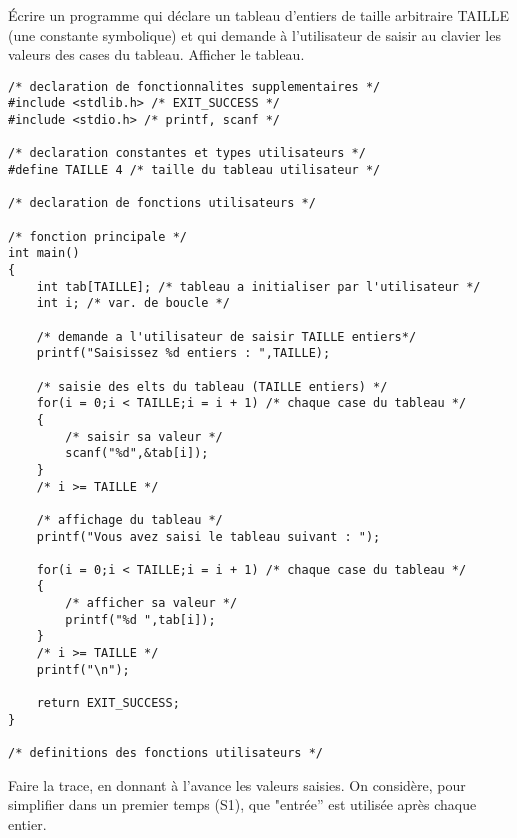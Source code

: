 Écrire un programme qui déclare un tableau d'entiers de taille arbitraire TAILLE (une constante symbolique) et qui demande à l'utilisateur de saisir au clavier les valeurs des cases du tableau. Afficher le tableau.

\begin{correction}
\begin{verbatim}
/* declaration de fonctionnalites supplementaires */
#include <stdlib.h> /* EXIT_SUCCESS */
#include <stdio.h> /* printf, scanf */

/* declaration constantes et types utilisateurs */
#define TAILLE 4 /* taille du tableau utilisateur */

/* declaration de fonctions utilisateurs */

/* fonction principale */
int main()
{
    int tab[TAILLE]; /* tableau a initialiser par l'utilisateur */
    int i; /* var. de boucle */

    /* demande a l'utilisateur de saisir TAILLE entiers*/
    printf("Saisissez %d entiers : ",TAILLE);

    /* saisie des elts du tableau (TAILLE entiers) */
    for(i = 0;i < TAILLE;i = i + 1) /* chaque case du tableau */
    {
        /* saisir sa valeur */
        scanf("%d",&tab[i]);
    }
    /* i >= TAILLE */

    /* affichage du tableau */
    printf("Vous avez saisi le tableau suivant : ");

    for(i = 0;i < TAILLE;i = i + 1) /* chaque case du tableau */
    {
        /* afficher sa valeur */
        printf("%d ",tab[i]);
    }
    /* i >= TAILLE */
    printf("\n");

    return EXIT_SUCCESS;
}

/* definitions des fonctions utilisateurs */
\end{verbatim}

Faire la trace, en donnant à l'avance les valeurs saisies. On considère, pour simplifier dans un premier temps (S1), que "entrée'' est utilisée après chaque entier.
\end{correction}


